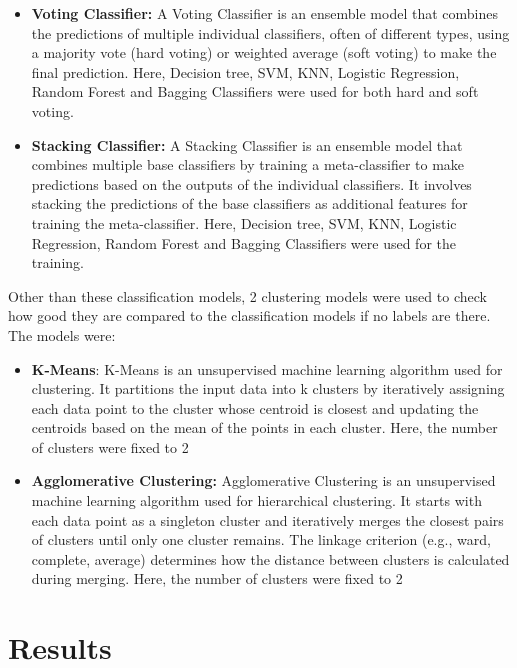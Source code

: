 \documentclass{article}
\begin{document}
\begin{itemize}
    \item  \textbf{Voting Classifier:} A Voting Classifier is an ensemble model that combines the predictions of multiple individual classifiers, often of different types, using a majority vote (hard voting) or weighted average (soft voting) to make the final prediction. Here, Decision tree, SVM, KNN, Logistic Regression, Random Forest and Bagging Classifiers were used for both hard and soft voting.

    \item \textbf{Stacking Classifier:} A Stacking Classifier is an ensemble model that combines multiple base classifiers by training a meta-classifier to make predictions based on the outputs of the individual classifiers. It involves stacking the predictions of the base classifiers as additional features for training the meta-classifier. Here, Decision tree, SVM, KNN, Logistic Regression, Random Forest and Bagging Classifiers were used for the training.
    
\end{itemize}

Other than these classification models, 2 clustering models were used to check how good they are compared to the classification models if no labels are there. The models were:

\begin{itemize}
    \item \textbf{K-Means}: K-Means is an unsupervised machine learning algorithm used for clustering. It partitions the input data into k clusters by iteratively assigning each data point to the cluster whose centroid is closest and updating the centroids based on the mean of the points in each cluster. Here, the number of clusters were fixed to 2

    \item \textbf{Agglomerative Clustering:} Agglomerative Clustering is an unsupervised machine learning algorithm used for hierarchical clustering. It starts with each data point as a singleton cluster and iteratively merges the closest pairs of clusters until only one cluster remains. The linkage criterion (e.g., ward, complete, average) determines how the distance between clusters is calculated during merging. Here, the number of clusters were fixed to 2

\end{itemize}

\section{Results}
\end{document}
